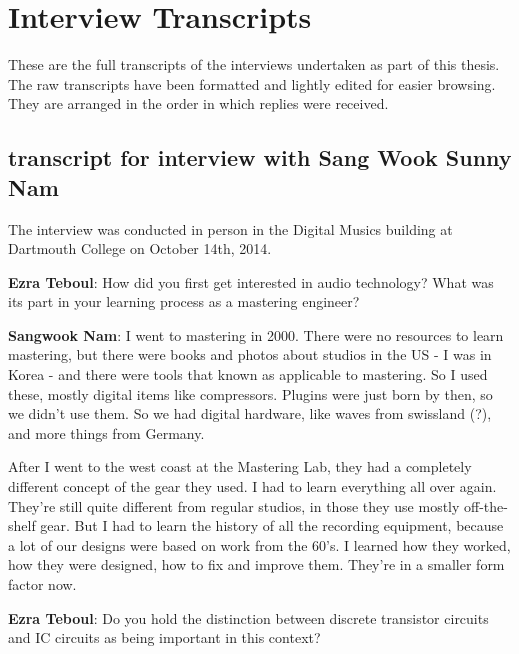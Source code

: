 
\chapter{Interview Transcripts}\label{app:inttrans} %


These are the full transcripts of the interviews undertaken as part of this thesis. The raw transcripts have been formatted and lightly edited for easier browsing. They are arranged in the order in which replies were received.  

\clearpage 
\section{transcript for interview with Sang Wook Sunny Nam}

The interview was conducted in person in the Digital Musics building at Dartmouth College on October 14th, 2014. 

\textbf{Ezra Teboul}: How did you first get interested in audio technology? What was its part in your learning process as a mastering engineer?

\textbf{Sangwook Nam}: I went to mastering in 2000. There were no resources to learn mastering, but there were books and photos about studios in the US - I was in Korea - and there were tools that known as applicable to mastering. So I used these, mostly digital items like compressors. Plugins were just born by then, so we didn't use them. So we had digital hardware, like waves from swissland (?), and more things from Germany.

After I went to the west coast at the Mastering Lab, they had a completely different concept of the gear they used. I had to learn everything all over again. They're still quite different from regular studios, in those they use mostly off-the-shelf gear. But I had to learn the history of all the recording equipment, because a lot of our designs were based on work from the 60's. I learned how they worked, how they were designed, how to fix and improve them. They're in a smaller form factor now.

\textbf{Ezra Teboul}: Do you hold the distinction between discrete transistor circuits and IC circuits as being important in this context?

